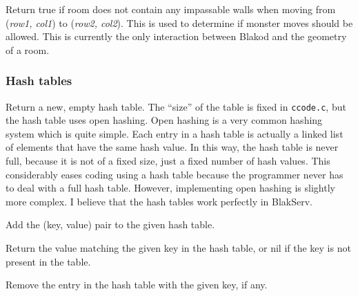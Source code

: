 \begin{leftlines}
\end{leftlines}

Return true if room does not contain any impassable walls when moving
from ({\em row1, col1}) to ({\em row2, col2}).  This is used to
determine if monster moves should be allowed.  This is currently the
only interaction between Blakod and the geometry of a room.

\subsubsection{Hash tables}

\begin{leftlines}
\end{leftlines}

Return a new, empty hash table.  The ``size'' of the table is fixed in {\tt ccode.c},
but the hash table uses open hashing.  Open hashing is a very common
hashing system which is quite simple.  Each entry in a hash table is
actually a linked list of elements that have the same hash value.  In
this way, the hash table is never full, because it is not of a fixed size,
just a fixed number of hash values.  This considerably eases coding using
a hash table because the programmer never has to deal with a full hash table.
However, implementing open hashing is slightly more complex.  I believe that
the hash tables work perfectly in BlakServ.


\begin{leftlines}
\end{leftlines}

Add the (key, value) pair to the given hash table.

\begin{leftlines}
\end{leftlines}

Return the value matching the given key in the hash table, or nil if
the key is not present in the table.

\begin{leftlines}
\end{leftlines}

Remove the entry in the hash table with the given key, if any.

\begin{leftlines}
\end{leftlines}

